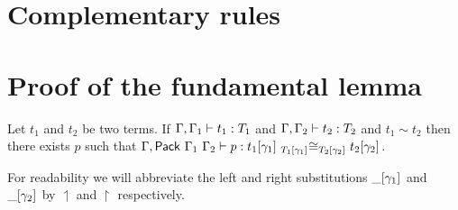 \section{Complementary rules}
\label{sec:more-rules}




\section{Proof of the fundamental lemma}
\label{sec:proof-fund-lemma}

\begin{lemma}
  Let $t_1$ and $t_2$ be two terms. If $\isterm{\Ga, \Ga_1}{t_1}{T_1}$ and
  $\isterm{\Ga, \Ga_2}{t_2}{T_2}$ and $t_1 \sim t_2$ then there exists $p$ such
  that
  $\isterm{\Ga, \Pack{\Ga_1}{\Ga_2}}
          {p}
          {\Heq{\llift{\gamma}{}{T_1}}
               {\llift{\gamma}{}{t_1}}
               {\rlift{\gamma}{}{T_2}}
               {\rlift{\gamma}{}{t_2}}}$.
\end{lemma}

For readability we will abbreviate the left and right substitutions
$\llift{\gamma}{}{\_}$ and $\rlift{\gamma}{}{\_}$ by $\upharpoonleft$
and $\upharpoonright$ respectively.

